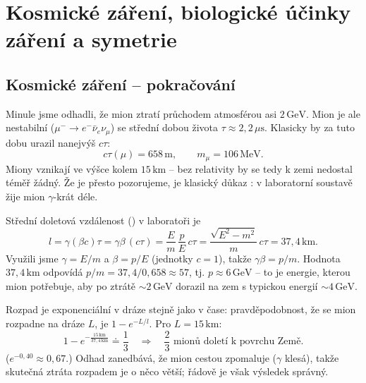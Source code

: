 \section{Kosmické záření, biologické účinky záření a symetrie}

\subsection{Kosmické záření – pokračování}

Minule jsme odhadli, že mion ztratí průchodem atmosférou asi \(2\,\text{GeV}\).
Mion je ale nestabilní (\(\mu^-\to e^-\bar\nu_e\nu_\mu\)) se střední dobou
života \(\tau \approx 2{,}2\,\mu\text{s}\). Klasicky by za tuto dobu urazil
nanejvýš \(c\tau\):
\[
  c\tau(\mu) = 658\,\text{m}, \qquad m_\mu = 106\,\text{MeV}.
\]
Miony vznikají ve výšce kolem \(15\,\text{km}\) – bez relativity by se tedy
k zemi nedostal téměř žádný. Že je přesto pozorujeme, je klasický důkaz
: v laboratorní soustavě žije mion \(\gamma\)-krát déle.

Střední doletová vzdálenost () v laboratoři je
\[
  l = \gamma(\beta c)\tau = \gamma\beta\,(c\tau)
    = \frac{E}{m}\,\frac{p}{E}\,c\tau
    = \frac{\sqrt{E^2-m^2}}{m}\,c\tau = 37{,}4\,\text{km}.
\]
Využili jsme \(\gamma = E/m\) a \(\beta = p/E\) (jednotky \(c=1\)), takže
\(\gamma\beta = p/m\). Hodnota \(37{,}4\,\text{km}\) odpovídá
\(p/m = 37{,}4/0{,}658 \approx 57\), tj. \(p \approx 6\,\text{GeV}\) – to je
energie, kterou mion potřebuje, aby po ztrátě \(\sim 2\,\text{GeV}\) dorazil
na zem s typickou energií \(\sim 4\,\text{GeV}\).

\begin{priklad}
Rozpad je exponenciální v dráze stejně jako v čase: pravděpodobnost, že se
mion rozpadne na dráze \(L\), je \(1 - e^{-L/l}\). Pro \(L = 15\,\text{km}\):
\[
  1 - e^{-\frac{15\,\text{km}}{37{,}4\,\text{km}}} \doteq \frac13
  \quad\Longrightarrow\quad \frac23 \text{ mionů doletí k povrchu Země.}
\]
(\(e^{-0{,}40}\approx 0{,}67\).) Odhad zanedbává, že mion cestou zpomaluje
(\(\gamma\) klesá), takže skutečná ztráta rozpadem je o něco větší; řádově
je však výsledek správný.
\end{priklad}

